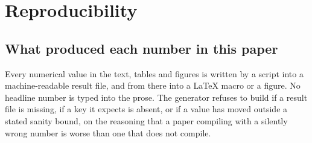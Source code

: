 \section{Reproducibility}
\label{app:reproducibility}

\subsection*{What produced each number in this paper}

Every numerical value in the text, tables and figures is written by a script into
a machine-readable result file, and from there into a \LaTeX{} macro or a figure.
No headline number is typed into the prose. The generator refuses to build if a
result file is missing, if a key it expects is absent, or if a value has moved
outside a stated sanity bound, on the reasoning that a paper compiling with a
silently wrong number is worse than one that does not compile.


